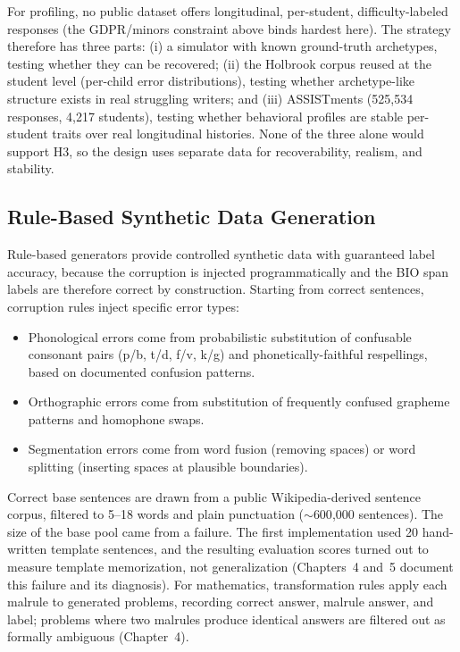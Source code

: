 For profiling, no public dataset offers longitudinal, per-student, difficulty-labeled responses (the GDPR/minors constraint above binds hardest here). The strategy therefore has three parts: (i) a simulator with known ground-truth archetypes, testing whether they can be recovered; (ii) the Holbrook corpus reused at the student level (per-child error distributions), testing whether archetype-like structure exists in real struggling writers; and (iii) ASSISTments (525{,}534 responses, 4{,}217 students), testing whether behavioral profiles are stable per-student traits over real longitudinal histories. None of the three alone would support H3, so the design uses separate data for recoverability, realism, and stability.

\subsection{Rule-Based Synthetic Data Generation}
\label{sec:method_data_rule}

Rule-based generators provide controlled synthetic data with guaranteed label accuracy, because the corruption is injected programmatically and the BIO span labels are therefore correct by construction. Starting from correct sentences, corruption rules inject specific error types:
\begin{itemize}
    \item Phonological errors come from probabilistic substitution of confusable consonant pairs (p/b, t/d, f/v, k/g) and phonetically-faithful respellings, based on documented confusion patterns.
    \item Orthographic errors come from substitution of frequently confused grapheme patterns and homophone swaps.
    \item Segmentation errors come from word fusion (removing spaces) or word splitting (inserting spaces at plausible boundaries).
\end{itemize}

Correct base sentences are drawn from a public Wikipedia-derived sentence corpus, filtered to 5--18 words and plain punctuation ($\sim$600{,}000 sentences). The size of the base pool came from a failure. The first implementation used 20 hand-written template sentences, and the resulting evaluation scores turned out to measure template memorization, not generalization (Chapters~4 and~5 document this failure and its diagnosis). For mathematics, transformation rules apply each malrule to generated problems, recording correct answer, malrule answer, and label; problems where two malrules produce identical answers are filtered out as formally ambiguous (Chapter~4).

